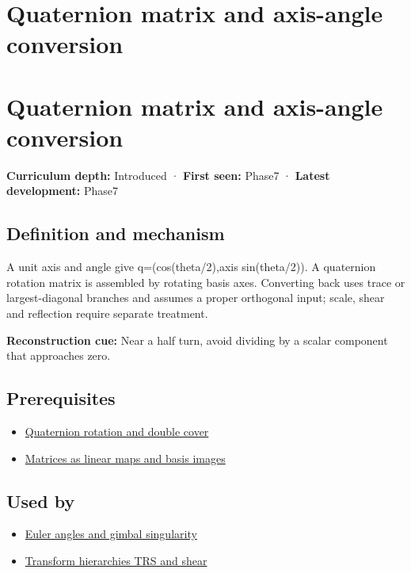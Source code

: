 \hypertarget{appendix-26d8da71f6c4}{}
\section*{Quaternion matrix and axis-angle conversion}
\section{Quaternion matrix and axis-angle conversion}\label{appendix-26d8da71f6c4-quaternion-matrix-and-axis-angle-conversion}

\textbf{Curriculum depth:} Introduced · \textbf{First seen:} Phase7 · \textbf{Latest development:} Phase7

\subsection{Definition and mechanism}\label{appendix-26d8da71f6c4-definition-and-mechanism}

A unit axis and angle give q=(cos(theta/2),axis sin(theta/2)). A quaternion rotation matrix is assembled by rotating basis axes. Converting back uses trace or largest-diagonal branches and assumes a proper orthogonal input; scale, shear and reflection require separate treatment.

\textbf{Reconstruction cue:} Near a half turn, avoid dividing by a scalar component that approaches zero.

\subsection{Prerequisites}\label{appendix-26d8da71f6c4-prerequisites}

\begin{itemize}
\tightlist
\item
  \hyperref[appendix-8e61ab68f6b2]{Quaternion rotation and double cover}
\item
  \hyperref[appendix-bd39c3bf5d64]{Matrices as linear maps and basis images}
\end{itemize}

\subsection{Used by}\label{appendix-26d8da71f6c4-used-by}

\begin{itemize}
\tightlist
\item
  \hyperref[appendix-5f723fbd0593]{Euler angles and gimbal singularity}
\item
  \hyperref[appendix-292c061cd47c]{Transform hierarchies TRS and shear}
\end{itemize}

